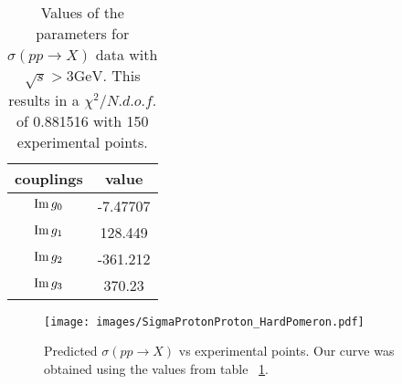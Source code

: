 \documentclass[preprint, 12pt]{elsarticle}
\begin{document}
\begin{table}[b!]
\centering
\caption{Values of the parameters for $\sigma\left(p p \rightarrow X\right)$ data with $ \sqrt{s} > 3 \text{GeV}$. This results in a $\chi^2 / {N.d.o.f.}$ of 0.881516 with 150 experimental points.}
\vspace{0.5cm}
\begin{tabular}{|c|c|}
\hline
couplings   & value \\
\hline
${\rm Im} \, g_0$  & -7.47707\\ 
\hline
${\rm Im} \, g_1$  & 128.449 \\ 
\hline
${\rm Im} \, g_2$  & -361.212  \\
\hline
${\rm Im} \, g_3$  & 370.23 \\ 
\hline
\end{tabular}
\label{table:SigmaPP_best_fit}
\end{table}

\begin{figure}[!h]
\center
\texttt{[image: images/SigmaProtonProton\_HardPomeron.pdf]} 
\caption{Predicted $\sigma\left(p p \rightarrow X\right)$ vs experimental points. Our curve was obtained using the values from table ~\ref{table:SigmaPP_best_fit}.}
\label{fig:SigmaPP_best_fit}
\end{figure}
\end{document}
